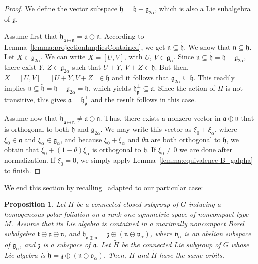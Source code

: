 \documentclass[12pt, a4paper]{amsart}
\newcommand{\g}{\mathfrak}
\newtheorem{proposition}[theorem]{Proposition}
\theoremstyle{definition}
\begin{document}
\begin{proof}
We define the vector subspace $\tilde{\g{h}}=\g{h}+\g{g}_{2\alpha}$, which is also a Lie subalgebra of $\g{g}$.

Assume first that $\tilde{\g{h}}_{\g{a}\oplus\g{n}}=\g{a}\oplus\g{n}$.
According to Lemma~\ref{lemma:projectionImpliesContained}, we get $\g{n}\subseteq\tilde{\g{h}}$.
We show that $\g{n}\subseteq\g{h}$.
Let $X\in\g{g}_{2\alpha}$.
We can write $X=[U,V]$, with $U$, $V\in\g{g}_\alpha$.
Since $\g{n}\subseteq\tilde{\g{h}}=\g{h}+\g{g}_{2\alpha}$, 
there exist $Y$, $Z\in\g{g}_{2\alpha}$ such that $U+Y$, $V+Z\in\g{h}$.
But then, $X=[U,V]=[U+Y,V+Z]\in\g{h}$ and it follows that $\g{g}_{2\alpha}\subseteq\g{h}$.
This readily implies $\g{n}\subseteq\tilde{\g{h}}=\g{h}+\g{g}_{2\alpha}=\g{h}$,
which yields $\g{h}_{\g{p}}^\perp\subseteq \g{a}$.
Since the action of $H$ is not transitive, this gives $\g{a}=\g{h}_\g{p}^\perp$ 
and the result follows in this case.

Assume now that $\tilde{\g{h}}_{\g{a}\oplus\g{n}}\neq\g{a}\oplus\g{n}$.
Thus, there exists a nonzero vector in $\g{a}\oplus\g{n}$ that is orthogonal to both $\g{h}$ and $\g{g}_{2\alpha}$.
We may write this vector as $\xi_0+\xi_\alpha$, where $\xi_0\in \g{a}$ and $\xi_\alpha\in \g{g}_{\alpha}$, and because $\xi_0+\xi_\alpha$ and $\theta\g{n}$ are both orthogonal to $\g{h}$, we obtain that $\xi_0+(1-\theta)\xi_\alpha$ is orthogonal to $\g{h}$.
If $\xi_0\neq 0$ we are done after normalization.
If $\xi_0=0$, we simply apply Lemma~\ref{lemma:equivalence-B+galpha} to finish.
\end{proof}

We end this section by recalling~\cite[Proposition~4.8]{DiazLorenzo} adapted to our particular case:

\begin{proposition}\label{prop:orbit-equivalence}
Let $H$ be a connected closed subgroup of $G$ inducing a homogeneous polar foliation on a rank one symmetric space of noncompact type $M$.
Assume that its Lie algebra is contained in a maximally noncompact Borel subalgebra $\g{t}\oplus\g{a}\oplus\g{n}$,
and $\g{h}_{\g{a}\oplus\g{n}}=\g{z}\oplus(\g{n}\ominus\g{v}_\alpha)$, where $\g{v}_\alpha$ is an abelian subspace of $\g{g}_\alpha$, and $\g{z}$ is a subspace of $\g{a}$.
Let $\tilde{H}$ be the connected Lie subgroup of $G$ whose Lie algebra is $\tilde{\g{h}}=\g{z}\oplus(\g{n}\ominus\g{v}_\alpha)$.
Then, $H$ and $\tilde{H}$ have the same orbits.
\end{proposition}
\end{document}
